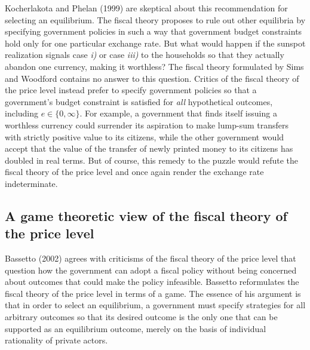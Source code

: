  Kocherlakota and Phelan (1999) are
 skeptical about this recommendation for selecting an equilibrium.
The fiscal theory proposes to rule out other  equilibria by
specifying government policies in such a way that government
budget constraints
 hold only for  one particular exchange rate. But what would happen
if the sunspot realization signals case {\it i)} or case {\it
iii)} to the households so that they actually abandon one
currency, making it worthless? The fiscal theory formulated by
Sims and Woodford contains no answer to this
question.
 Critics of the fiscal
theory of the price level instead prefer  to specify government
policies so that a government's budget constraint is satisfied for
{\it all\/} hypothetical outcomes, including $e\in\{0,\infty\}$.
For example, a government that finds itself issuing a worthless
currency could surrender its aspiration to make lump-sum transfers
with strictly positive value
 to its citizens, while  the other government
 would accept that the value of the  transfer of newly printed money to its citizens
has doubled in real terms. But of course, this remedy to the
puzzle would refute the fiscal theory of the price level and once
again render the  exchange rate indeterminate.   %



\subsection{A game theoretic view of the fiscal theory of the price level}\label{sec:BassettoFTPL}%
Bassetto (2002) agrees with criticisms of the fiscal theory of
the price level that question how the government can adopt a fiscal
policy  without being concerned about
outcomes that could make the policy infeasible. Bassetto  reformulates
the fiscal theory of the price level in terms of a game. The essence of his argument
is that in order to select an equilibrium, a government must specify
strategies for all arbitrary outcomes so that its desired outcome is the
only one that can be supported as an equilibrium outcome, merely on the
basis of individual rationality of private actors.
%

